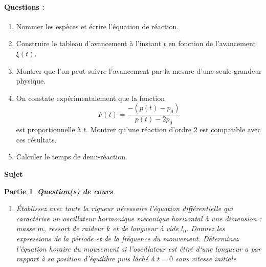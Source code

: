 \documentclass[a4paper,10pt,notitlepage,oneside]{article}
\theoremstyle{plain}
\newtheorem{partie}{\color{BlueViolet} Partie}
\begin{document}
\paragraph{\color{BlueViolet} Questions :}

\begin{enumerate}
    \item Nommer les espèces et écrire l'équation de réaction.
    \item Construire le tableau d'avancement à l'instant $t$ en fonction de l'avancement $\xi(t)$.
    \item Montrer que l'on peut suivre l'avancement par la mesure d'une seule grandeur physique.
    \item On constate expérimentalement que la fonction 
    \[
    F(t) = \frac{- (p(t) - p_0)}{p(t) - 2p_0}
    \]
    est proportionnelle à $t$. Montrer qu'une réaction d'ordre 2 est compatible avec ces résultats.
    \item Calculer le temps de demi-réaction.
\end{enumerate}

\newpage





\begin{center}
    {\color{BlueViolet} \Large \textbf{\color{BlueViolet}Sujet }}
\end{center}
\setcounter{partie}{0}
\begin{partie} \textbf{\color{BlueViolet} Question(s) de cours}
\begin{enumerate}
    \item Établissez avec toute la rigueur nécessaire l’équation différentielle qui caractérise un oscillateur harmonique mécanique horizontal à une dimension : masse $m$, ressort de raideur $k$ et de longueur à vide $l_0$. Donnez les expressions de la période et de la fréquence du mouvement. Déterminez l’équation horaire du mouvement si l’oscillateur est étiré d‘une longueur a par rapport à sa position d’équilibre puis lâché à $t = 0$ sans vitesse initiale
\end{enumerate}
\end{partie}
\end{document}
